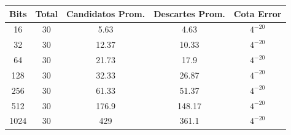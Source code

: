 \begin{tabular}{ccccc}
\toprule
Bits & Total & Candidatos Prom. & Descartes Prom. & Cota Error \\
\midrule
16 & 30 & 5.63 & 4.63 & $4^{-20}$ \\
32 & 30 & 12.37 & 10.33 & $4^{-20}$ \\
64 & 30 & 21.73 & 17.9 & $4^{-20}$ \\
128 & 30 & 32.33 & 26.87 & $4^{-20}$ \\
256 & 30 & 61.33 & 51.37 & $4^{-20}$ \\
512 & 30 & 176.9 & 148.17 & $4^{-20}$ \\
1024 & 30 & 429 & 361.1 & $4^{-20}$ \\
\bottomrule
\end{tabular}
